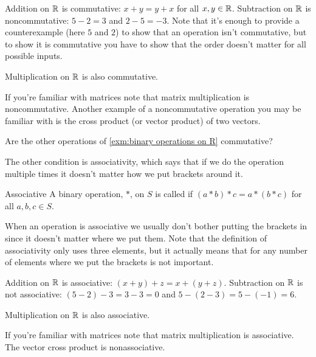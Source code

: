 \documentclass[fleqn]{LectureClass/LectureClass}
\begin{document}
    \begin{exm}{}{}
        Addition on \(\mathbb{R}\) is commutative: \(x + y = y + x\) for all \(x, y \in \mathbb{R}\).
        Subtraction on \(\mathbb{R}\) is noncommutative: \(5 - 2 = 3\) and \(2 - 5 = -3\).
        Note that it's enough to provide a counterexample (here \(5\) and \(2\)) to show that an operation isn't commutative, but to show it is commutative you have to show that the order doesn't matter for all possible inputs.
        
        Multiplication on \(\mathbb{R}\) is also commutative.
        
        If you're familiar with matrices note that matrix multiplication is noncommutative.
        Another example of a noncommutative operation you may be familiar with is the cross product (or vector product) of two vectors.
    \end{exm}
    
    \begin{problem}{}{}
        Are the other operations of \cref{exm:binary operations on R} commutative?
    \end{problem}
    
    The other condition is associativity, which says that if we do the operation multiple times it doesn't matter how we put brackets around it.
    
    \begin{dfn}{Associative}{}
        A binary operation, \(*\), on \(S\) is called  if \((a * b) * c = a * (b * c)\) for all \(a, b, c \in S\).
    \end{dfn}
    
    When an operation is associative we usually don't bother putting the brackets in since it doesn't matter where we put them.
    Note that the definition of associativity only uses three elements, but it actually means that for any number of elements where we put the brackets is not important.
    
    \begin{exm}{}{}
        Addition on \(\mathbb{R}\) is associative: \((x + y) + z = x + (y + z)\).
        Subtraction on \(\mathbb{R}\) is not associative: \((5 - 2) - 3 = 3 - 3 = 0\) and \(5 - (2 - 3) = 5 - (-1) = 6\).
        
        Multiplication on \(\mathbb{R}\) is also associative.
        
        If you're familiar with matrices note that matrix multiplication is associative.
        The vector cross product is nonassociative.
    \end{exm}
    
\end{document}
